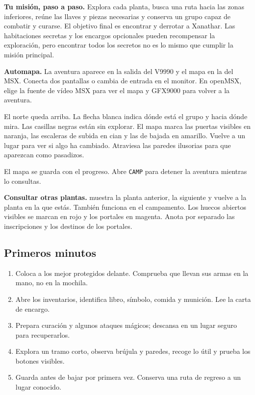 \textbf{Tu misión, paso a paso.} Explora cada planta, busca una ruta hacia las zonas inferiores, reúne las llaves y piezas necesarias y conserva un grupo capaz de combatir y curarse. El objetivo final es encontrar y derrotar a Xanathar. Las habitaciones secretas y los encargos opcionales pueden recompensar la exploración, pero encontrar todos los secretos no es lo mismo que cumplir la misión principal.

\textbf{Automapa.} La aventura aparece en la salida del V9990 y el mapa en la del MSX. Conecta dos pantallas o cambia de entrada en el monitor. En openMSX, elige la fuente de vídeo MSX para ver el mapa y GFX9000 para volver a la aventura.

El norte queda arriba. La flecha blanca indica dónde está el grupo y hacia dónde mira. Las casillas negras están sin explorar. El mapa marca las puertas visibles en naranja, las escaleras de subida en cian y las de bajada en amarillo. Vuelve a un lugar para ver si algo ha cambiado. Atraviesa las paredes ilusorias para que aparezcan como pasadizos.

El mapa se guarda con el progreso. Abre \texttt{CAMP} para detener la aventura mientras lo consultas.

\textbf{Consultar otras plantas.}  muestra la planta anterior,  la siguiente y  vuelve a la planta en la que estás. También funciona en el campamento. Los huecos abiertos visibles se marcan en rojo y los portales en magenta. Anota por separado las inscripciones y los destinos de los portales.

\subsection*{Primeros minutos}
\begin{enumerate}
\item Coloca a los mejor protegidos delante. Comprueba que llevan sus armas en la mano, no en la mochila.
\item Abre los inventarios, identifica libro, símbolo, comida y munición. Lee la carta de encargo.
\item Prepara curación y algunos ataques mágicos; descansa en un lugar seguro para recuperarlos.
\item Explora un tramo corto, observa brújula y paredes, recoge lo útil y prueba los botones visibles.
\item Guarda antes de bajar por primera vez. Conserva una ruta de regreso a un lugar conocido.
\end{enumerate}

